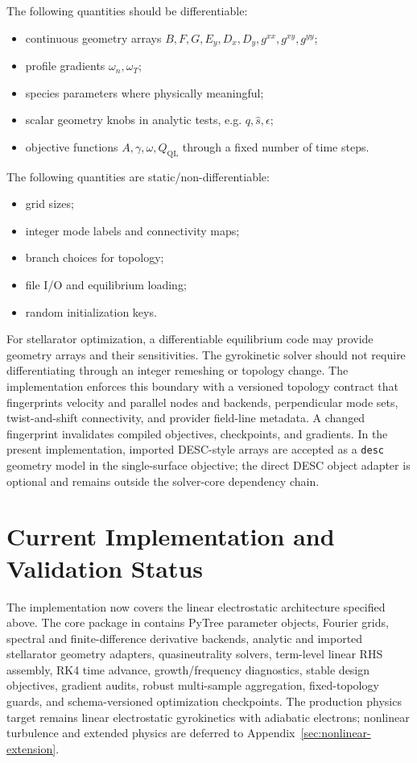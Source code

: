 \documentclass[11pt,a4paper]{article}
\begin{document}
The following quantities should be differentiable:
\begin{itemize}
  \item continuous geometry arrays \(B,F,G,E_y,D_x,D_y,g^{xx},g^{xy},g^{yy}\);
  \item profile gradients \(\omega_n,\omega_T\);
  \item species parameters where physically meaningful;
  \item scalar geometry knobs in analytic tests, e.g. \(q,\hat s,\epsilon\);
  \item objective functions \(A,\gamma,\omega,Q_{\mathrm{QL}}\) through a fixed number of time steps.
\end{itemize}
The following quantities are static/non-differentiable:
\begin{itemize}
  \item grid sizes;
  \item integer mode labels and connectivity maps;
  \item branch choices for topology;
  \item file I/O and equilibrium loading;
  \item random initialization keys.
\end{itemize}
For stellarator optimization, a differentiable equilibrium code may provide geometry arrays and their sensitivities.  The gyrokinetic solver should not require differentiating through an integer remeshing or topology change.
The implementation enforces this boundary with a versioned topology contract
that fingerprints velocity and parallel nodes and backends, perpendicular mode
sets, twist-and-shift connectivity, and provider field-line metadata.  A changed
fingerprint invalidates compiled objectives, checkpoints, and gradients.
In the present implementation, imported DESC-style arrays are accepted as a
\texttt{desc} geometry model in the single-surface objective; the direct DESC object
adapter is optional and remains outside the solver-core dependency chain.


\section{Current Implementation and Validation Status}
\label{sec:current-status}

The implementation now covers the linear electrostatic architecture specified
above.  The core package in  contains PyTree parameter
objects, Fourier grids, spectral and finite-difference derivative backends,
analytic and imported stellarator geometry adapters, quasineutrality solvers,
term-level linear RHS assembly, RK4 time advance, growth/frequency diagnostics,
stable design objectives, gradient audits, robust multi-sample aggregation,
fixed-topology guards, and schema-versioned optimization checkpoints.  The production
physics target remains linear electrostatic gyrokinetics with adiabatic
electrons; nonlinear turbulence and extended physics are deferred to
Appendix~\ref{sec:nonlinear-extension}.
\end{document}
